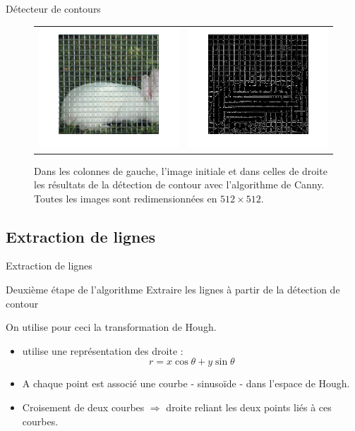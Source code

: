 \begin{frame}{Détecteur de contours}
\begin{figure}[ht!]
\centering
\begin{tabular}{cc}
\includegraphics[width = .5\columnwidth]{fig/lapin_rescale.png} &
\includegraphics[width = .5\columnwidth]{fig/contour_lapin.png}
\end{tabular}
\caption{Dans les colonnes de gauche, l'image initiale et dans celles de droite les résultats de la détection de contour avec l'algorithme de Canny. Toutes les images sont redimensionnées en $512\times 512$. }
\end{figure}
\end{frame}


\subsection{Extraction de lignes}

\begin{frame}{Extraction de lignes}
\begin{block}{Deuxième étape de l'algorithme}
Extraire les lignes à partir de la détection de contour
\end{block}
On utilise pour ceci la transformation de Hough.
\begin{itemize}
\item utilise une représentation des droite : 
\begin{equation}
r = x \cos \theta + y \sin\theta
\end{equation}
\item A chaque point est associé une courbe - sinusoïde - dans l'espace de Hough. 
\item Croisement de deux courbes $\Rightarrow$ droite reliant les deux points liés à ces courbes.
\end{itemize} 
\end{frame}


